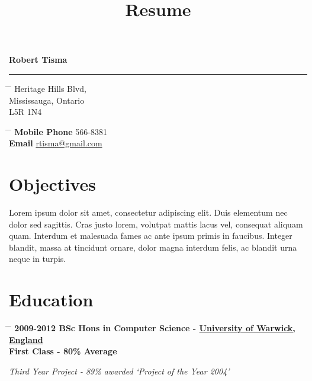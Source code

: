 \documentclass{article}
\title{Resume}
\author{\UserName}
\makeatletter
\def \UserName {Robert Tisma}
\def \UserEmail {rtisma@gmail.com}
\def \UserPhone {416 566-8381}
\def \UserStreetAddress {4651 Heritage Hills Blvd}
\def \UserCity {Mississauga}
\def \UserProvince {Ontario}
\def \UserPostalCode {L5R 1N4}
\makeatother
\begin{document}
{\huge{\color{slateblue}\textbf{\UserName}}}\\
\rule{\textwidth}{0.5mm}


\parbox{0.5\textwidth}{
\begin{tabbing}
\hspace{0cm} \= \hspace{4cm} \= \kill
\> \UserStreetAddress,\\
\> \UserCity, \UserProvince \\
\> \UserPostalCode \\
\end{tabbing}
}\hfil\parbox{0.5\textwidth}{
\begin{tabbing}
\hspace{3cm} \= \hspace{4cm} \= \kill
{\bf Mobile Phone} \> \UserPhone \\
{\bf Email} \> \href{mailto:\UserEmail}{\UserEmail} \\
\end{tabbing}
}

\section*{Objectives}
Lorem ipsum dolor sit amet, consectetur adipiscing elit. Duis elementum nec dolor sed sagittis. Cras justo lorem, volutpat mattis lacus vel, consequat aliquam quam. Interdum et malesuada fames ac ante ipsum primis in faucibus. Integer blandit, massa at tincidunt ornare, dolor magna interdum felis, ac blandit urna neque in turpis.


\section*{Education}

\begin{tabbing}
\hspace{2cm} \= \hspace{4cm} \= \kill
\bf{2009-2012} \> BSc Hons in Computer Science - \href{http://www.warwick.ac.uk}{University of Warwick, England} \\
\>First Class - 80\% Average\\
\rule{0mm}{5mm}\>\+
\textit{Third Year Project - 89\% awarded `Project of the Year 2004'}
\end{tabbing}
\end{document}
